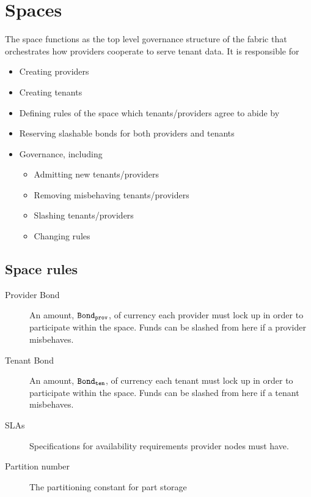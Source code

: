 \section{Spaces}

The space functions as the top level governance structure of the fabric that orchestrates how providers cooperate to serve tenant data. 
It is responsible for
\begin{itemize}
  \item Creating providers
  \item Creating tenants
  \item Defining rules of the space which tenants/providers agree to abide by
  \item Reserving slashable bonds for both providers and tenants
  \item Governance, including
    \begin{itemize}
      \item Admitting new tenants/providers
      \item Removing misbehaving tenants/providers
      \item Slashing tenants/providers
      \item Changing rules
    \end{itemize}
\end{itemize}

\subsection{Space rules}
\begin{description}
  \item[Provider Bond] An amount, $\mathtt{Bond_{prov}}$, of currency each provider must lock up in order to participate within the space. Funds can be slashed from here if a provider misbehaves.
  \item[Tenant Bond] An amount, $\mathtt{Bond_{ten}}$, of currency each tenant must lock up in order to participate within the space. Funds can be slashed from here if a tenant misbehaves.
  \item[SLAs] Specifications for availability requirements provider nodes must have.
  \item[Partition number] The partitioning constant for part storage %
\end{description}
